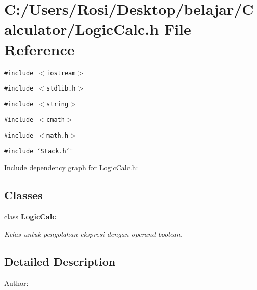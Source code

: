 \section{C:/Users/Rosi/Desktop/belajar/Calculator/Logic\-Calc.h File Reference}
\label{_logic_calc_8h}
{\tt \#include $<$iostream$>$}\par
{\tt \#include $<$stdlib.h$>$}\par
{\tt \#include $<$string$>$}\par
{\tt \#include $<$cmath$>$}\par
{\tt \#include $<$math.h$>$}\par
{\tt \#include \char`\"{}Stack.h\char`\"{}}\par


Include dependency graph for Logic\-Calc.h:\subsection*{Classes}
\begin{CompactItemize}
\item 
class {\bf Logic\-Calc}
\begin{CompactList}\small\item\em Kelas untuk pengolahan ekspresi dengan operand boolean. \item\end{CompactList}\end{CompactItemize}


\subsection{Detailed Description}
\begin{Desc}
\item[Author:]\end{Desc}
